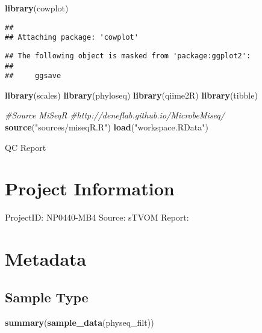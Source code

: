 \documentclass[]{article}
\newenvironment{Shaded}{\begin{snugshade}}{\end{snugshade}}
\newcommand{\KeywordTok}[1]{\textcolor[rgb]{0.13,0.29,0.53}{\textbf{#1}}}
\newcommand{\StringTok}[1]{\textcolor[rgb]{0.31,0.60,0.02}{#1}}
\newcommand{\CommentTok}[1]{\textcolor[rgb]{0.56,0.35,0.01}{\textit{#1}}}
\newcommand{\NormalTok}[1]{#1}
\begin{document}
\begin{Shaded}
\begin{Highlighting}[]
\KeywordTok{library}\NormalTok{(cowplot)}
\end{Highlighting}
\end{Shaded}

\begin{verbatim}
## 
## Attaching package: 'cowplot'
\end{verbatim}

\begin{verbatim}
## The following object is masked from 'package:ggplot2':
## 
##     ggsave
\end{verbatim}

\begin{Shaded}
\begin{Highlighting}[]
\KeywordTok{library}\NormalTok{(scales)}
\KeywordTok{library}\NormalTok{(phyloseq)}
\KeywordTok{library}\NormalTok{(qiime2R)}
\KeywordTok{library}\NormalTok{(tibble)}

\CommentTok{#Source MiSeqR}
\CommentTok{#http://deneflab.github.io/MicrobeMiseq/}
\KeywordTok{source}\NormalTok{(}\StringTok{"sources/miseqR.R"}\NormalTok{)}
\KeywordTok{load}\NormalTok{(}\StringTok{"workspace.RData"}\NormalTok{)}
\end{Highlighting}
\end{Shaded}

QC Report

\section{Project Information}\label{project-information}

ProjectID: NP0440-MB4 Source: sTVOM Report:

\section{Metadata}\label{metadata}

\subsection{Sample Type}\label{sample-type}

\begin{Shaded}
\begin{Highlighting}[]
\KeywordTok{summary}\NormalTok{(}\KeywordTok{sample_data}\NormalTok{(physeq_filt))}
\end{Highlighting}
\end{Shaded}
\end{document}
